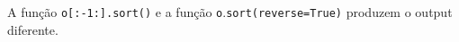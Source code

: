 \documentclass[12pt,varwidth=16cm,border=1pt]{standalone}
\begin{document}
A função \verb+o+\verb+[:-1:].sort()+ e a função \verb+o+.\verb+sort(reverse=True)+ produzem o output diferente.

\questiomtrue
\end{document}
